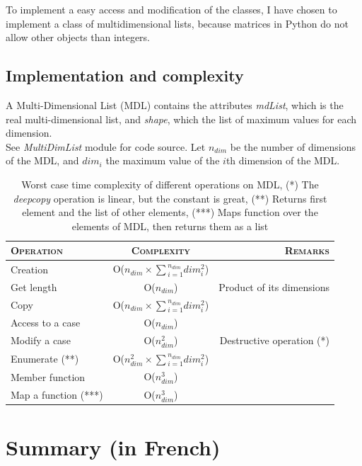 \documentclass{report}
\begin{document}
To implement a easy access and modification of the classes, I have chosen to implement a class of multidimensional lists, because matrices in Python do not allow other objects than integers.

\section{Implementation and complexity}

A Multi-Dimensional List (MDL) contains the attributes \emph{mdList}, which is the real multi-dimensional list, and \emph{shape}, which the list of maximum values for each dimension.\\

See \emph{MultiDimList} module for code source. Let $n_{dim}$ be the number of dimensions of the MDL, and $dim_{i}$ the maximum value of the $i$th dimension of the MDL.\\

\begin{table}
\caption{Worst case time complexity of different operations on MDL, (*) The \emph{deepcopy} operation is linear, but the constant is great, (**) Returns first element and the list of other elements, (***) Maps function over the elements of MDL, then returns them as a list}
\begin{tabular}{|l|c|r|}
\hline
\textsc{Operation} & \textsc{Complexity} & \textsc{Remarks}\\
\hline
Creation & O($n_{dim} \times \sum{_{i = 1}^{n_{dim}}}{dim_{i}^{2}}$)\\
\hline
Get length & O($n_{dim}$) & Product of its dimensions\\
\hline
Copy & O($n_{dim} \times \sum{_{i = 1}^{n_{dim}}}{dim_{i}^{2}}$) \\
\hline
Access to a case & O($n_{dim}$)\\
\hline
Modify a case & O($n_{dim}^{2}$) & Destructive operation (*)\\
\hline
Enumerate (**) & O($n_{dim}^{2} \times \sum{_{i = 1}^{n_{dim}}}{dim_{i}^{2}}$)\\
\hline
Member function & O($n_{dim}^{3}$)\\
\hline
Map a function (***) & O($n_{dim}^{3}$)\\
\hline
\end{tabular}
\end{table}

\chapter{Summary (in French)}
\end{document}
